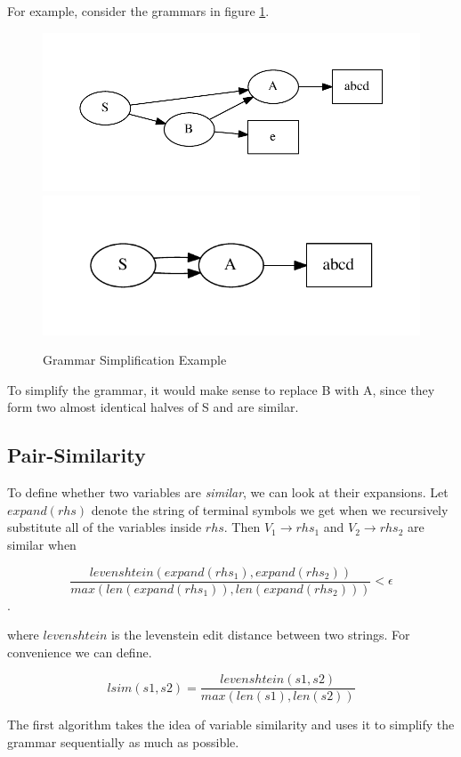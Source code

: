 \documentclass[11pt]{article}
\begin{document}
For example, consider the grammars in figure \ref{sred}.

\begin{figure}[t]
\centering
\includegraphics[scale=0.6]{sred1.pdf}
\includegraphics[scale=0.6]{sred2.pdf}
\caption{Grammar Simplification Example}
\label{sred}
\end{figure}

To simplify the grammar, it would make sense to replace B with A, since
they form two almost identical halves of S and are similar.

\subsection{Pair-Similarity}

To define whether two variables are \emph{similar}, we can look at their
expansions. Let $expand(rhs)$ denote the string of terminal symbols we get
when we recursively substitute all of the variables inside $rhs$. Then
$V_1 \rightarrow rhs_1$ and $V_2 \rightarrow rhs_2$ are similar when

$$\frac{levenshtein(expand(rhs_1),expand(rhs_2))}
        {max(len(expand(rhs_1)),len(expand(rhs_2)))} < \epsilon$$.

where $levenshtein$ is the levenstein edit distance between two strings.
For convenience we can define.

$$lsim(s1,s2) = \frac{levenshtein(s1,s2)}{max(len(s1),len(s2))}$$

The first algorithm takes the idea of variable similarity and uses it
to simplify the grammar sequentially as much as possible.
\end{document}
